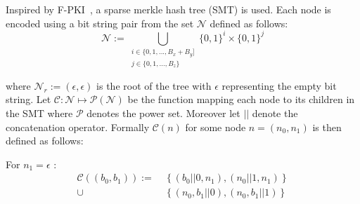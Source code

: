 \documentclass[10pt,conference,compsocconf]{IEEEtran}
\begin{document}
Inspired by F-PKI~\cite{chuat_f-pki_2022}, a sparse merkle hash tree (SMT) is used.
Each node is encoded using a bit string pair from the set $\mathcal{N}$ defined as follows:
\begin{equation}
	\mathcal{N} := \bigcup_{\substack{i \in \{0, 1, ..., B_x + B_y]\\j \in \{0, 1, ..., B_z\}}} \{0, 1\}^{i} \times \{0, 1\}^{j}
\end{equation}

where $\mathcal{N}_r := \left(\epsilon, \epsilon \right)$ is the root of the tree with $\epsilon$ representing the empty bit string.
Let $\mathcal{C}: \mathcal{N} \mapsto \mathcal{P}\left(\mathcal{N}\right)$ be the function mapping each node to its children in the SMT where $\mathcal{P}$ denotes the power set.
Moreover let $||$ denote the concatenation operator.
Formally $\mathcal{C}(n)$ for some node $n = (n_{0}, n_1)$ is then defined as follows:

%

For $n_1 = \epsilon$ :
\begin{align*}
	\mathcal{C}\left(\left(b_0, b_1\right)\right) :=\:& \left\{(b_0 || 0, n_1), (n_0 || 1, n_1)\right\}\\
	\cup & \left\{(n_0, b_1 || 0), (n_0, b_1 || 1) \right\}
\end{align*}
\end{document}
